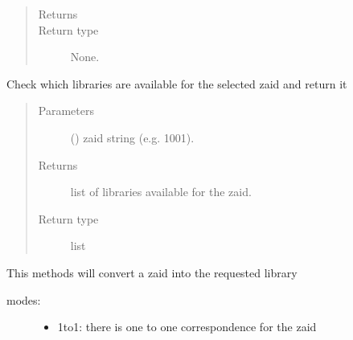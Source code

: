 \documentclass[letterpaper,10pt,english]{sphinxmanual}
\begin{document}
\begin{fulllineitems}
\begin{quote}
\begin{description}
\begin{itemize}
\end{itemize}

\item[{Returns}] \leavevmode
\sphinxAtStartPar


\item[{Return type}] \leavevmode
\sphinxAtStartPar
None.

\end{description}\end{quote}

\begin{fulllineitems}
\label{\detokenize{api/initobjects:libmanager.LibManager.check4zaid}}
\sphinxAtStartPar
Check which libraries are available for the selected zaid and return it
\begin{quote}\begin{description}
\item[{Parameters}] \leavevmode
\sphinxAtStartPar
{} () \textendash{} zaid string (e.g. 1001).

\item[{Returns}] \leavevmode
\sphinxAtStartPar
{} \textendash{} list of libraries available for the zaid.

\item[{Return type}] \leavevmode
\sphinxAtStartPar
list

\end{description}\end{quote}

\end{fulllineitems}


\begin{fulllineitems}
\label{\detokenize{api/initobjects:libmanager.LibManager.convertZaid}}
\sphinxAtStartPar
This methods will convert a zaid into the requested library
\begin{description}
\item[{modes:}] \leavevmode\begin{itemize}
\item {} 
\sphinxAtStartPar
1to1: there is one to one correspondence for the zaid


\end{itemize}
\end{description}
\end{fulllineitems}
\end{fulllineitems}
\end{document}

